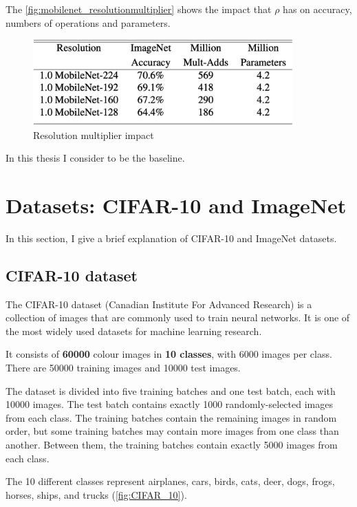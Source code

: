 The \autoref{fig:mobilenet_resolutionmultiplier} shows the impact that $\rho$
has on accuracy, numbers of operations and parameters.

\begin{figure}[ht]
    \includegraphics[width=10cm]{images/experiments/mobilenet_resolutionmultiplier.png}
    \centering
    \caption{Resolution multiplier impact}\label{fig:mobilenet_resolutionmultiplier}
\end{figure}

In this thesis I consider  to be the baseline.

\section{Datasets: CIFAR-10 and ImageNet}
In this section, I give a brief explanation of CIFAR-10 and ImageNet datasets.

\subsection{CIFAR-10 dataset}
The CIFAR-10 dataset (Canadian Institute For Advanced Research) is a collection
of images that are commonly used to train neural networks. It is one of the
most widely used datasets for machine learning research.

It consists of \textbf{60000}  colour images in
\textbf{10 classes}, with 6000 images per class. There are 50000 training
images and 10000 test images.

The dataset is divided into five training batches and one test batch, each with
10000 images. The test batch contains exactly 1000 randomly-selected images
from each class. The training batches contain the remaining images in random
order, but some training batches may contain more images from one class than
another. Between them, the training batches contain exactly 5000 images from
each class.

The 10 different classes represent airplanes, cars, birds, cats, deer, dogs,
frogs, horses, ships, and trucks (\autoref{fig:CIFAR_10}).

